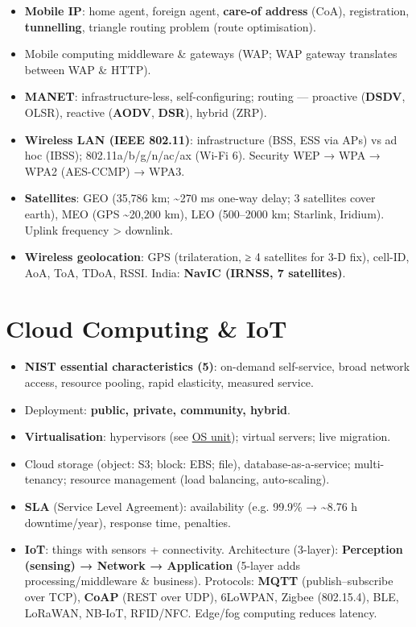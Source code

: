 \begin{itemize}
\tightlist
\item
  \textbf{Mobile IP}: home agent, foreign agent, \textbf{care-of address} (CoA), registration, \textbf{tunnelling}, triangle routing problem (route optimisation).
\item
  Mobile computing middleware \& gateways (WAP; WAP gateway translates between WAP \& HTTP).
\item
  \textbf{MANET}: infrastructure-less, self-configuring; routing --- proactive (\textbf{DSDV}, OLSR), reactive (\textbf{AODV}, \textbf{DSR}), hybrid (ZRP).
\item
  \textbf{Wireless LAN (IEEE 802.11)}: infrastructure (BSS, ESS via APs) vs ad hoc (IBSS); 802.11a/b/g/n/ac/ax (Wi-Fi 6). Security WEP → WPA → WPA2 (AES-CCMP) → WPA3.
\item
  \textbf{Satellites}: GEO (35,786 km; \textasciitilde270 ms one-way delay; 3 satellites cover earth), MEO (GPS \textasciitilde20,200 km), LEO (500--2000 km; Starlink, Iridium). Uplink frequency \textgreater{} downlink.
\item
  \textbf{Wireless geolocation}: GPS (trilateration, ≥ 4 satellites for 3-D fix), cell-ID, AoA, ToA, TDoA, RSSI. India: \textbf{NavIC (IRNSS, 7 satellites)}.
\end{itemize}

\needspace{95pt}

\hypertarget{p2-09--13-cloud-computing--iot}{%
\section{Cloud Computing \& IoT}\label{p2-09--13-cloud-computing--iot}}



\begin{itemize}
\tightlist
\item
  \textbf{NIST essential characteristics (5)}: on-demand self-service, broad network access, resource pooling, rapid elasticity, measured service.
\item
  Deployment: \textbf{public, private, community, hybrid}.
\item
  \textbf{Virtualisation}: hypervisors (see \protect\hyperlink{p2-05--11-virtual-machines}{OS unit}); virtual servers; live migration.
\item
  Cloud storage (object: S3; block: EBS; file), database-as-a-service; multi-tenancy; resource management (load balancing, auto-scaling).
\item
  \textbf{SLA} (Service Level Agreement): availability (e.g. 99.9\% → \textasciitilde8.76 h downtime/year), response time, penalties.
\item
  \textbf{IoT}: things with sensors + connectivity. Architecture (3-layer): \textbf{Perception (sensing) → Network → Application} (5-layer adds processing/middleware \& business). Protocols: \textbf{MQTT} (publish--subscribe over TCP), \textbf{CoAP} (REST over UDP), 6LoWPAN, Zigbee (802.15.4), BLE, LoRaWAN, NB-IoT, RFID/NFC. Edge/fog computing reduces latency.
\end{itemize}

